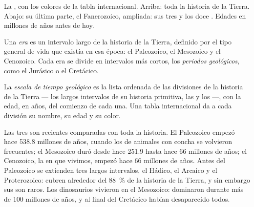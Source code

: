 \begin{omfigure}
{\small La , con los colores de la tabla
internacional. Arriba: toda la historia de la Tierra. Abajo: su última
parte, el Fanerozoico, ampliada: sus tres  y los doce . Edades en millones de años antes de hoy.}
\label{fig:g7:geological-time:scale}
\end{omfigure}

\begin{definition}\label{def:g7:geological-time:era-period}
Una \emph{era} es un intervalo largo de la historia de la
Tierra, definido por el tipo general de vida que existía en esa época: el
Paleozoico, el Mesozoico y el Cenozoico. Cada era se divide en intervalos
más cortos, los \emph{periodos geológicos},
como el Jurásico o el Cretácico.
\end{definition}

\begin{definition}\label{def:g7:geological-time:time-scale}
La \emph{escala de tiempo geológico} es la lista
ordenada de las divisiones de la historia de la Tierra --- los largos
intervalos de su historia primitiva, las  y los 
---, con la edad, en años, del comienzo de cada una. Una tabla
internacional da a cada división su nombre, su edad y su color.
\end{definition}


Las tres  son recientes comparadas con toda la historia. El Paleozoico
empezó hace \num{538.8} millones de años, cuando los  de animales
con concha se volvieron frecuentes; el Mesozoico duró desde hace
\num{251.9} hasta hace \num{66} millones de años; el Cenozoico, la  en
que vivimos, empezó hace \num{66} millones de años. Antes del Paleozoico
se extienden tres largos intervalos, el Hádico, el Arcaico y el
Proterozoico: cubren alrededor del 88~\% de la historia de la Tierra, y
sin embargo sus  son raros. Los dinosaurios vivieron en el
Mesozoico: dominaron durante más de \num{100} millones de años, y al final
del Cretácico habían desaparecido todos.

